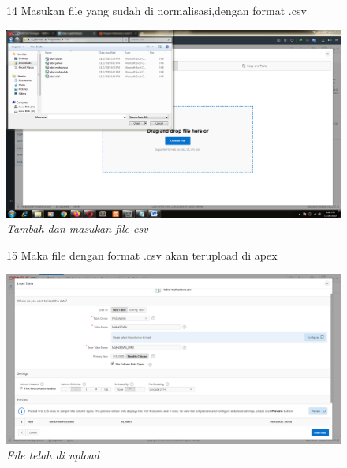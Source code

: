 \begin{enumerate}
\begin{figure}[!htbp]
\item[14] Masukan file yang sudah di normalisasi,dengan format .csv
	\begin{center}
	\includegraphics[scale=0.2]{figures/tahap11c.png}
	\caption{\textit{Tambah dan masukan file csv}}
	\end{center}	 
\end{figure}

\begin{figure}[!htbp]
\item[15] Maka file dengan format .csv akan terupload di apex
	\begin{center}
	\includegraphics[scale=0.2]{figures/tahap14.png}
	\caption{\textit{File telah di upload}}
	\end{center}	 
\end{figure}


\end{enumerate}
